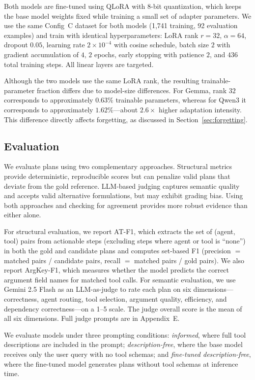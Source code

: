 \documentclass[conference]{IEEEtran}
\begin{document}
Both models are fine-tuned using QLoRA with 8-bit quantization, which keeps the base model weights fixed while training a small set of adapter parameters. We use the same Config~C dataset for both models (1,741 training, 92 evaluation examples) and train with identical hyperparameters: LoRA rank $r=32$, $\alpha=64$, dropout $0.05$, learning rate $2 \times 10^{-4}$ with cosine schedule, batch size $2$ with gradient accumulation of $4$, $2$ epochs, early stopping with patience $2$, and $436$ total training steps. All linear layers are targeted.

Although the two models use the same LoRA rank, the resulting trainable-parameter fraction differs due to model-size differences. For Gemma, rank $32$ corresponds to approximately $0.63\%$ trainable parameters, whereas for Qwen3 it corresponds to approximately $1.62\%$---about $2.6\times$ higher adaptation intensity. This difference directly affects forgetting, as discussed in Section~\ref{sec:forgetting}.


\subsection{Evaluation}

We evaluate plans using two complementary approaches. Structural metrics provide deterministic, reproducible scores but can penalize valid plans that deviate from the gold reference. LLM-based judging captures semantic quality and accepts valid alternative formulations, but may exhibit grading bias. Using both approaches and checking for agreement provides more robust evidence than either alone.

For structural evaluation, we report AT-F1, which extracts the set of (agent, tool) pairs from actionable steps (excluding steps where agent or tool is ``none'') in both the gold and candidate plans and computes set-based F1 (precision $=$ matched pairs / candidate pairs, recall $=$ matched pairs / gold pairs). We also report ArgKey-F1, which measures whether the model predicts the correct argument field names for matched tool calls. For semantic evaluation, we use Gemini 2.5 Flash as an LLM-as-judge \cite{b13} to rate each plan on six dimensions---correctness, agent routing, tool selection, argument quality, efficiency, and dependency correctness---on a 1--5 scale. The judge overall score is the mean of all six dimensions. Full judge prompts are in Appendix~E.

We evaluate models under three prompting conditions: \emph{informed}, where full tool descriptions are included in the prompt; \emph{description-free}, where the base model receives only the user query with no tool schemas; and \emph{fine-tuned description-free}, where the fine-tuned model generates plans without tool schemas at inference time.
\end{document}
